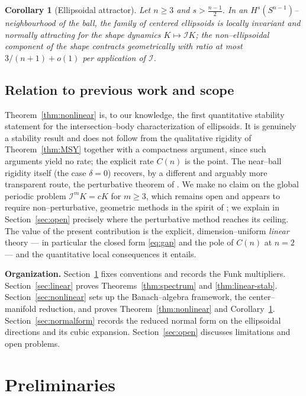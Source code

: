 \documentclass[11pt,reqno]{amsart}
\theoremstyle{plain}
\newtheorem{corollary}[theorem]{Corollary}
\theoremstyle{definition}
\newcommand{\Sph}{S^{n-1}}
\newcommand{\IB}{\mathcal{I}}
\begin{document}
\begin{corollary}[Ellipsoidal attractor]\label{cor:attractor}
Let $n\ge 3$ and $s>\tfrac{n-1}{2}$. In an $H^s(\Sph)$--neighbourhood of the
ball, the family of centered ellipsoids is locally invariant and normally
attracting for the shape dynamics $K\mapsto \IB K$; the non--ellipsoidal
component of the shape contracts geometrically with ratio at most
$3/(n+1)+o(1)$ per application of $\IB$.
\end{corollary}

\subsection{Relation to previous work and scope}
Theorem~\ref{thm:nonlinear} is, to our knowledge, the first quantitative
stability statement for the intersection--body characterization of ellipsoids.
It is genuinely a stability result and does not follow from the qualitative
rigidity of Theorem~\ref{thm:MSY} together with a compactness argument, since
such arguments yield no rate; the explicit rate $C(n)$ is the point. The
near--ball rigidity itself (the case $\delta=0$) recovers, by a different and
arguably more transparent route, the perturbative theorem of
\cite{FNRZ2011}. We make no claim on the global periodic problem
$\IB^m K = cK$ for $m\ge 3$, which remains open and appears to require
non--perturbative, geometric methods in the spirit of \cite{MSY2025}; we
explain in Section~\ref{sec:open} precisely where the perturbative method
reaches its ceiling. The value of the present contribution is the explicit,
dimension--uniform \emph{linear} theory --- in particular the closed form
\eqref{eq:gap} and the pole of $C(n)$ at $n=2$ --- and the quantitative local
consequences it entails.

\medskip
\noindent\textbf{Organization.} Section~\ref{sec:prelim} fixes conventions and
records the Funk multipliers. Section~\ref{sec:linear} proves
Theorems~\ref{thm:spectrum} and \ref{thm:linear-stab}.
Section~\ref{sec:nonlinear} sets up the Banach--algebra framework, the
center--manifold reduction, and proves Theorem~\ref{thm:nonlinear} and
Corollary~\ref{cor:attractor}. Section~\ref{sec:normalform} records the reduced
normal form on the ellipsoidal directions and its cubic expansion.
Section~\ref{sec:open} discusses limitations and open problems.

\section{Preliminaries}\label{sec:prelim}
\end{document}
